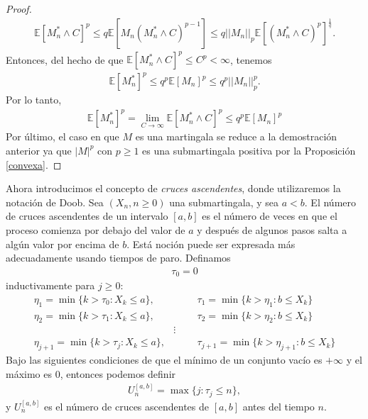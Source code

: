 \begin{proof}
\begin{align*}
		\mathbb{E}[M_n^{*} \wedge C]^p \leq q\mathbb{E}[M_n (M_n^{*} \wedge C)^{p-1}] \leq q ||M_n||_p \mathbb{E}[(M_n^{*} \wedge C)^p]^{\frac{1}{q}}.
	\end{align*}
Entonces, del hecho de que $\mathbb{E}[M_n^{*} \wedge C]^p \leq C^p < \infty$, tenemos
	\begin{align*}
		\mathbb{E}[M_n^{*}]^p \leq q^p\mathbb{E}[M_n]^p \leq q^p ||M_n||_p^p.
	\end{align*}
Por lo tanto, 
	\begin{align*}
		\mathbb{E}[M_n^{*}]^p = \lim_{C \rightarrow \infty} \mathbb{E}[M_n^{*} \wedge C]^p \leq q^p\mathbb{E}[M_n]^p
	\end{align*}
Por último, el caso en que $M$ es una martingala se reduce a la demostración anterior ya que $|M|^p$ con $p \geq 1$ es una submartingala positiva por la Proposición \ref{convexa}.
\end{proof}

Ahora introducimos el concepto de \emph{cruces ascendentes}, donde utilizaremos la notación de Doob. Sea $(X_n, n \geq 0)$ una submartingala, y sea $a < b$. El número de cruces ascendentes de un intervalo $[a, b]$ es el número de veces en que el proceso comienza por debajo del valor de $a$ y después de algunos pasos salta a algún valor por encima de $b$. Está noción puede ser expresada más adecuadamente usando tiempos de paro. Definamos
\begin{align*}
	\tau_0 = 0
\end{align*}
inductivamente para $j \geq 0$:
	\begin{align*}
		\eta_{1} = \min \{k > \tau_0 : X_k \leq a \}, & \hspace{1cm} \tau_{1} = \min \{k > \eta_{1} : b \leq X_k \} \\
		\eta_{2} = \min \{k > \tau_1 : X_k \leq a \}, & \hspace{1cm} \tau_{2} = \min \{k > \eta_{2} : b \leq X_k \} \\
		& \vdots \\
		\eta_{j+1} = \min \{k > \tau_j : X_k \leq a \}, & \hspace{1cm} \tau_{j+1} = \min \{k > \eta_{j+1} : b \leq X_k \}
	\end{align*}
Bajo las siguientes condiciones de que el mínimo de un conjunto vacío es $+ \infty$ y el máximo es $0$, entonces podemos definir
	\begin{align}
		U_n^{[a, b]} = \max \{j : \tau_j \leq n\}, \label{aan}
	\end{align}
y $U_n^{[a, b]}$ es el número de cruces ascendentes de $[a, b]$ antes del tiempo $n$.

